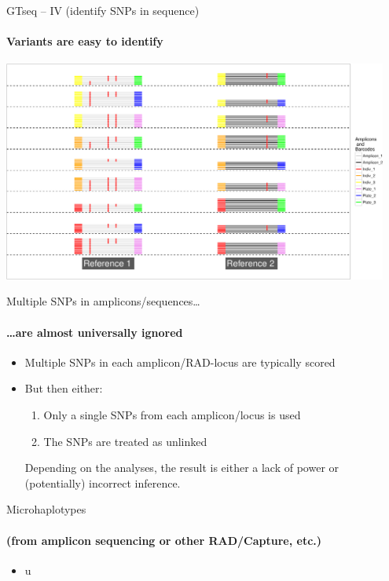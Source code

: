 \documentclass[letter,graphicx]{beamer}
\begin{document}
\begin{frame}{GTseq -- IV (identify SNPs in sequence)}
\framesubtitle{Variants are easy to identify}
\begin{center}
\includegraphics[width=0.95\textwidth]{mhap_figs/gtseq-snps-crop.pdf}
\end{center}
\end{frame}




\begin{frame}{Multiple SNPs in amplicons/sequences\ldots}
\framesubtitle{\ldots are almost universally ignored }
\begin{itemize}
\item Multiple SNPs in each amplicon/RAD-locus are typically scored
\item But then either:
\begin{enumerate}
\item Only a single SNPs from each amplicon/locus is used
\item The SNPs are treated as unlinked
\end{enumerate}
Depending on the analyses, the result is either a lack of power or (potentially) incorrect inference.
\end{itemize}
\end{frame}





\begin{frame}{Microhaplotypes}
\framesubtitle{(from amplicon sequencing or other RAD/Capture, etc.)}
\begin{itemize}
\item u
\end{itemize}
\end{frame}
\end{document}
